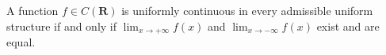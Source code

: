 A function $f \in C(\mathbf{R})$ is uniformly continuous in every admissible uniform structure if and only if $\lim_{x \to +\infty} f(x)$ and $\lim_{x \to -\infty} f(x)$ exist and are equal.

